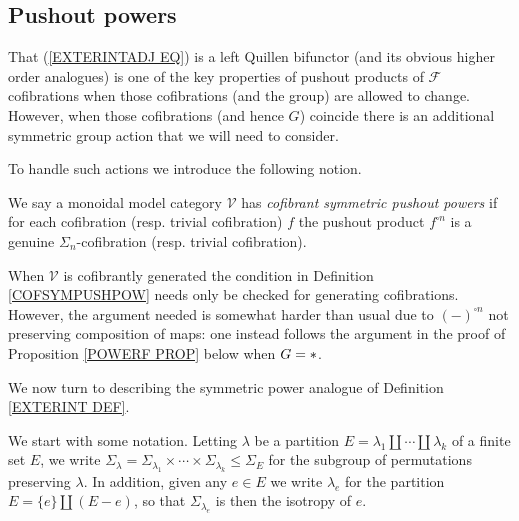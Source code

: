 \documentclass[a4paper,10pt]{article}%
\begin{document}
\subsection{Pushout powers}


That (\ref{EXTERINTADJ EQ}) is a left Quillen bifunctor (and its obvious higher order analogues) is one of the key properties of pushout products of $\mathcal{F}$ cofibrations when those cofibrations (and the group) are allowed to change. However, when those cofibrations (and hence $G$) coincide there is an additional symmetric group action that  we will need to consider.

To handle such actions we introduce the following notion.

\begin{definition}\label{COFSYMPUSHPOW}
  We say a monoidal model category $\mathcal{V}$ has 
  \textit{cofibrant symmetric pushout powers}
  if for each cofibration (resp. trivial cofibration) $f$ the pushout product 
  $f^{\square n}$ is a genuine $\Sigma_n$-cofibration (resp. trivial cofibration).
\end{definition}


\begin{remark}
  When $\mathcal{V}$ is cofibrantly generated
  the condition in Definition \ref{COFSYMPUSHPOW} needs only be checked for generating cofibrations. 
  However, the argument needed is somewhat harder than usual due to $(-)^{\square n}$ not preserving composition of maps:
  one instead follows the argument in the proof of 
  Proposition \ref{POWERF PROP} below when $G=\**$.
\end{remark}




We now turn to describing the symmetric power analogue of 
Definition \ref{EXTERINT DEF}.

We start with some notation. Letting 
$\lambda$ be a partition 
$E = \lambda_1 \amalg\cdots \amalg \lambda_k$
of a finite set $E$, 
we write 
$\Sigma_{\lambda} = \Sigma_{\lambda_1} \times \cdots \times
\Sigma_{\lambda_k} \leq \Sigma_E$ for the subgroup of permutations preserving $\lambda$. 
In addition, given any $e \in E$ we write
$\lambda_e$ for the partition $E = \{e\} \amalg (E-e)$, so that $\Sigma_{\lambda_e}$ is then the isotropy of $e$.
\end{document}
